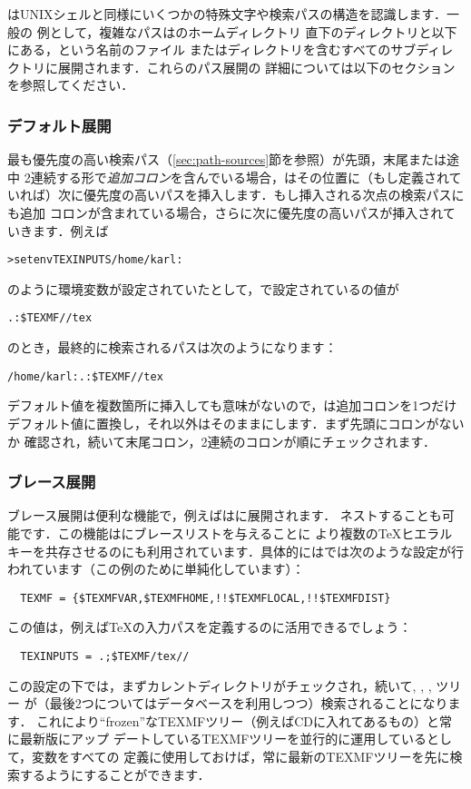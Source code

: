 \documentclass[uplatex,dvipdfmx,tombow]{jsarticle}
\begin{document}
\KPS はUNIXシェルと同様にいくつかの特殊文字や検索パスの構造を認識します．一般の
例として，複雑なパスはのホームディレクトリ
直下のディレクトリと以下にある，という名前のファイル
またはディレクトリを含むすべてのサブディレクトリに展開されます．これらのパス展開の
詳細については以下のセクションを参照してください．

\subsubsection{デフォルト展開}
\label{sec:default-expansion}

最も優先度の高い検索パス（\ref{sec:path-sources}節を参照）が先頭，末尾または途中
2連続する形で\emph{追加コロン}を含んでいる場合，\KPS はその位置に（もし定義されて
いれば）次に優先度の高いパスを挿入します．もし挿入される次点の検索パスにも追加
コロンが含まれている場合，さらに次に優先度の高いパスが挿入されていきます．例えば
%
\begin{alltt}
> setenv TEXINPUTS /home/karl:
\end{alltt}
%
のように環境変数が設定されていたとして，で設定されているの値が
%
\begin{alltt}
  .:\$TEXMF//tex
\end{alltt}
%
のとき，最終的に検索されるパスは次のようになります：
%
\begin{alltt}
  /home/karl:.:\$TEXMF//tex
\end{alltt}
デフォルト値を複数箇所に挿入しても意味がないので，\KPS は追加コロンを1つだけ
デフォルト値に置換し，それ以外はそのままにします．まず先頭にコロンがないか
確認され，続いて末尾コロン，2連続のコロンが順にチェックされます．

\subsubsection{ブレース展開}
\label{sec:brace-expansion}

ブレース展開は便利な機能で，例えばはに展開されます．
ネストすることも可能です．この機能はにブレースリストを与えることに
より複数の\TeX ヒエラルキーを共存させるのにも利用されています．具体的にはでは次のような設定が行われています（この例のために単純化しています）：
%
\begin{verbatim}
  TEXMF = {$TEXMFVAR,$TEXMFHOME,!!$TEXMFLOCAL,!!$TEXMFDIST}
\end{verbatim}
%
この値は，例えば\TeX の入力パスを定義するのに活用できるでしょう：
%
\begin{verbatim}
  TEXINPUTS = .;$TEXMF/tex//
\end{verbatim}
%
この設定の下では，まずカレントディレクトリがチェックされ，続いて, , , ツリー
が（最後2つについてはデータベースを利用しつつ）検索されることになります．
これにより``frozen''なTEXMFツリー（例えばCDに入れてあるもの）と常に最新版にアップ
デートしているTEXMFツリーを並行的に運用しているとして，変数をすべての
定義に使用しておけば，常に最新のTEXMFツリーを先に検索するようにすることができます．
\end{document}
